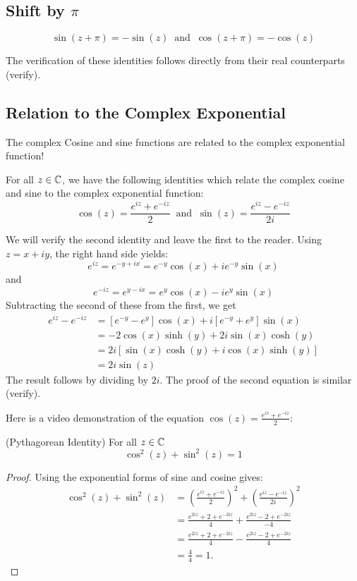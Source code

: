 \documentclass[handout]{ximera}
\begin{document}
\subsection{Shift by $\pi$}
\begin{proposition}
\[
\sin(z + \pi) = -\sin(z) \;\; \mbox{and} \;\; \cos(z+\pi) = -\cos(z)
\]
\end{proposition}
The verification of these identities follows directly from their real counterparts (verify).

\subsection{Relation to the Complex Exponential}
The complex Cosine and sine functions are related to the complex exponential function!
\begin{proposition}
For all $z \in \mathbb C$, we have the following identities which relate the complex cosine and sine to the complex exponential function:
\[
\cos(z) = \frac{e^{iz} + e^{-iz}}{2} \;\; \mbox{and} \;\;  \sin(z) = \frac{e^{iz} - e^{-iz}}{2i}
\]
\end{proposition}
We will verify the second identity and leave the first to the reader. Using $z = x+iy$, the right hand side yields:
\[
e^{iz} = e^{-y+ix} = e^{-y}\cos(x) + ie^{-y}\sin(x)
\]
and
\[
e^{-iz} = e^{y-ix} = e^{y}\cos(x) - ie^{y}\sin(x)
\]
Subtracting the second of these from the first, we get
\begin{align*}
e^{iz} - e^{-iz} &= \left[e^{-y}-e^y\right]\cos(x) + i\left[e^{-y}+e^y\right]\sin(x)\\
&=-2\cos(x) \sinh(y) +2i \sin(x)\cosh(y)\\
& = 2i\left[\sin(x)\cosh(y) + i \cos(x)\sinh(y)\right]\\
&=2i\sin(z)
\end{align*}
The result follows by dividing by $2i$.
The proof of the second equation is similar (verify).

Here is a video demonstration of the equation $\cos(z) = \frac{e^{iz}+e^{-iz}}{2}$:\\
\begin{foldable}
\end{foldable}

\begin{corollary}(Pythagorean Identity)
  For all $z \in \mathbb C$
  \[\cos^2(z) + \sin^2(z) = 1\]
  
\end{corollary}
\begin{proof}
  Using the exponential forms of sine and cosine gives:
  \begin{align*}
    \cos^2(z) + \sin^2(z) &= \left(\frac{e^{iz} + e^{-iz}}{2}\right)^2 + \left(\frac{e^{iz} - e^{-iz}}{2i}  \right)^2\\
                         &= \frac{e^{2iz} + 2 + e^{-2iz}}{4} + \frac{e^{2iz} - 2 + e^{-2iz}}{-4}\\
                         &= \frac{e^{2iz} + 2 + e^{-2iz}}{4} - \frac{e^{2iz} - 2 + e^{-2iz}}{4}\\
                         &= \frac44 = 1.                
  \end{align*}
\end{proof}
\end{document}
